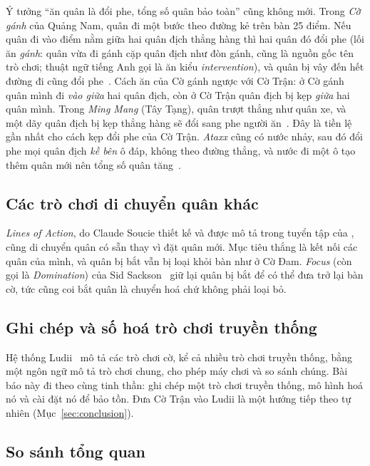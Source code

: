 Ý tưởng ``ăn quân là đổi phe, tổng số quân bảo toàn'' cũng không mới. Trong
\emph{Cờ gánh} của Quảng Nam, quân đi một bước theo đường kẻ trên bàn 25
điểm. Nếu quân đi vào điểm nằm giữa hai quân địch thẳng hàng thì hai quân
đó đổi phe (lối ăn \emph{gánh}: quân vừa đi gánh cặp quân địch như đòn gánh, cũng là
nguồn gốc tên trò chơi; thuật ngữ tiếng Anh gọi là ăn kiểu \emph{intervention}), và quân bị vây đến hết đường đi cũng đổi
phe~\citep{mytour_coganh,fptshop_coganh}. Cách ăn của Cờ gánh ngược với Cờ
Trận: ở Cờ gánh quân mình đi \emph{vào giữa} hai quân địch, còn ở Cờ Trận
quân địch bị kẹp \emph{giữa} hai quân mình. Trong \emph{Ming Mang} (Tây
Tạng), quân trượt thẳng như quân xe, và một dãy quân địch bị kẹp thẳng hàng
sẽ đổi sang phe người ăn~\citep{wiki_mingmang}. Đây là tiền lệ gần nhất cho
cách kẹp đổi phe của Cờ Trận. \emph{Ataxx} cũng có nước nhảy, sau đó đổi
phe mọi quân địch \emph{kề bên} ô đáp, không theo đường thẳng, và nước đi
một ô tạo thêm quân mới nên tổng số quân tăng~\citep{gebop_ataxx}.

\subsection{Các trò chơi di chuyển quân khác}

\emph{Lines of Action}, do Claude Soucie thiết kế và được mô tả trong tuyển
tập của \citet{sackson1969gamut}, cũng di chuyển quân có sẵn thay vì đặt
quân mới. Mục tiêu thắng là kết nối các quân của mình, và quân bị bắt vẫn
bị loại khỏi bàn như ở Cờ Đam. \emph{Focus} (còn gọi là
\emph{Domination}) của Sid Sackson~\citep{sackson1969gamut} giữ lại quân bị
bắt để có thể đưa trở lại bàn cờ, tức cũng coi bắt quân là chuyển hoá chứ
không phải loại bỏ.

\subsection{Ghi chép và số hoá trò chơi truyền thống}

Hệ thống Ludii~\citep{piette2020ludii} mô tả các trò chơi cờ, kể cả nhiều
trò chơi truyền thống, bằng một ngôn ngữ mô tả trò chơi chung, cho phép máy
chơi và so sánh chúng. Bài báo này đi theo cùng tinh thần: ghi chép một trò
chơi truyền thống, mô hình hoá nó và cài đặt nó để bảo tồn. Đưa Cờ Trận
vào Ludii là một hướng tiếp theo tự nhiên (Mục~\ref{sec:conclusion}).

\subsection{So sánh tổng quan}

